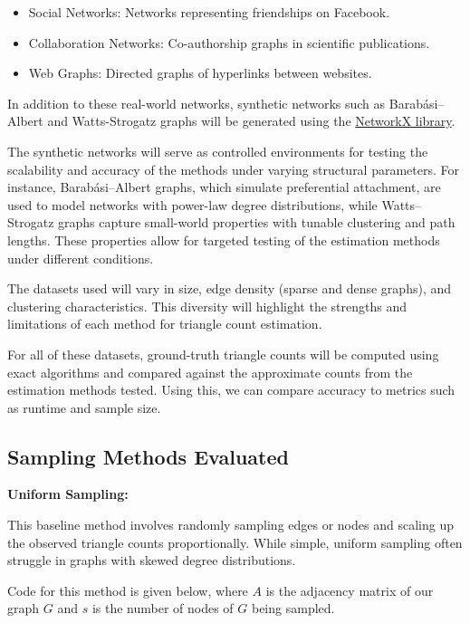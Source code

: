 \documentclass[11pt]{article}
\newcommand{\subsubsubsection}[1]{
  \vspace{1em} %
  \noindent\textbf{#1} %
  \vspace{0.5em} %
}
\begin{document}
\begin{itemize}
    \item Social Networks: Networks representing friendships on Facebook.
    \item Collaboration Networks: Co-authorship graphs in scientific publications.
    \item Web Graphs: Directed graphs of hyperlinks between websites.
\end{itemize}

In addition to these real-world networks, synthetic networks such as Barabási–Albert \cite{albert_statistical_2002} and Watts-Strogatz \cite{watts_collective_1998} graphs will be generated using the \href{https://networkx.org/}{NetworkX library}.

The synthetic networks will serve as controlled environments for testing the scalability and accuracy of the methods under varying structural parameters.
For instance, Barabási–Albert graphs, which simulate preferential attachment, are used to model networks with power-law degree distributions, while Watts–Strogatz graphs capture small-world properties with tunable clustering and path lengths.
These properties allow for targeted testing of the estimation methods under different conditions.

The datasets used will vary in size, edge density (sparse and dense graphs), and clustering characteristics.
This diversity will highlight the strengths and limitations of each method for triangle count estimation.

For all of these datasets, ground-truth triangle counts will be computed using exact algorithms and compared against the approximate counts from the estimation methods tested.
Using this, we can compare accuracy to metrics such as runtime and sample size.

\subsection{Sampling Methods Evaluated}

\subsubsubsection{Uniform Sampling:}

This baseline method involves randomly sampling edges or nodes and scaling up the observed triangle counts proportionally.
While simple, uniform sampling often struggle in graphs with skewed degree distributions.

Code for this method is given below, where $A$ is the adjacency matrix of our graph $G$ and $s$ is the number of nodes of $G$ being sampled.
\end{document}
